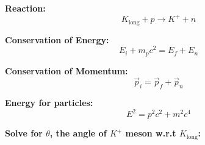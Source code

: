 \documentclass{article}
\begin{document}
\textbf{Reaction:}
\[ K_{\text{long}} + p \rightarrow K^+ + n \]

\textbf{Conservation of Energy:}
\begin{equation}
    E_i + m_p c^2 = E_f + E_n
\end{equation}

\textbf{Conservation of Momentum:}
\begin{equation}
    \vec{p}_i = \vec{p}_f + \vec{p}_n
\end{equation}

\textbf{Energy for particles:}
\begin{equation}
    E^2 = p^2 c^2 + m^2 c^4
\end{equation}

\textbf{Solve for \( \theta \), the angle of \( K^+ \) meson w.r.t \( K_{\text{long}} \):}
\end{document}
